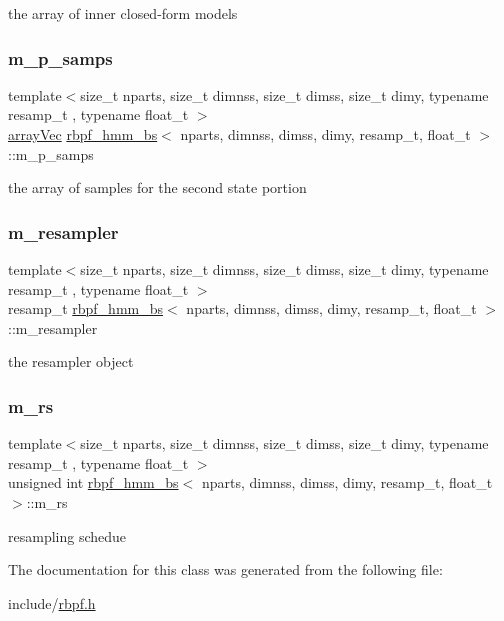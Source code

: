 the array of inner closed-\/form models \mbox{\label{classrbpf__hmm__bs_aa7b6a726eed547f0c30d12b499d5a251}} 
\subsubsection{\texorpdfstring{m\+\_\+p\+\_\+samps}{m\_p\_samps}}
{\footnotesize\ttfamily template$<$size\+\_\+t nparts, size\+\_\+t dimnss, size\+\_\+t dimss, size\+\_\+t dimy, typename resamp\+\_\+t , typename float\+\_\+t $>$ \\
\hyperlink{classrbpf__hmm__bs_a073f5b7f5015d394259510b20f693a19}{array\+Vec} \hyperlink{classrbpf__hmm__bs}{rbpf\+\_\+hmm\+\_\+bs}$<$ nparts, dimnss, dimss, dimy, resamp\+\_\+t, float\+\_\+t $>$\+::m\+\_\+p\+\_\+samps\hspace{0.3cm}{\ttfamily [private]}}

the array of samples for the second state portion \mbox{\label{classrbpf__hmm__bs_ad7b27f32a6ff8e79ff0ffd7cf6f14434}} 
\subsubsection{\texorpdfstring{m\+\_\+resampler}{m\_resampler}}
{\footnotesize\ttfamily template$<$size\+\_\+t nparts, size\+\_\+t dimnss, size\+\_\+t dimss, size\+\_\+t dimy, typename resamp\+\_\+t , typename float\+\_\+t $>$ \\
resamp\+\_\+t \hyperlink{classrbpf__hmm__bs}{rbpf\+\_\+hmm\+\_\+bs}$<$ nparts, dimnss, dimss, dimy, resamp\+\_\+t, float\+\_\+t $>$\+::m\+\_\+resampler\hspace{0.3cm}{\ttfamily [private]}}

the resampler object \mbox{\label{classrbpf__hmm__bs_a3c6154b8e0914dd042d6b08cfcb7d729}} 
\subsubsection{\texorpdfstring{m\+\_\+rs}{m\_rs}}
{\footnotesize\ttfamily template$<$size\+\_\+t nparts, size\+\_\+t dimnss, size\+\_\+t dimss, size\+\_\+t dimy, typename resamp\+\_\+t , typename float\+\_\+t $>$ \\
unsigned int \hyperlink{classrbpf__hmm__bs}{rbpf\+\_\+hmm\+\_\+bs}$<$ nparts, dimnss, dimss, dimy, resamp\+\_\+t, float\+\_\+t $>$\+::m\+\_\+rs\hspace{0.3cm}{\ttfamily [private]}}

resampling schedue 

The documentation for this class was generated from the following file\+:\begin{DoxyCompactItemize}
\item 
include/\hyperlink{rbpf_8h}{rbpf.\+h}\end{DoxyCompactItemize}
